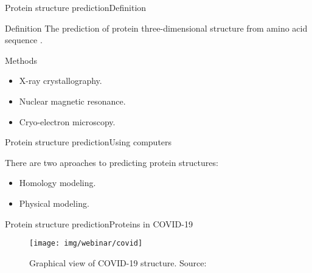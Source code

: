 \documentclass[10pt]{beamer}
\newcommand{\1}{
        	\setbeamertemplate{background}{
        		\texttt{[image: img/1]}
        		\tikz[overlay] \fill[fill opacity=0.75,fill=white] (0,0) rectangle (-\paperwidth,\paperheight);
        	}
}
\begin{document}
\begin{frame}{Protein structure prediction}{Definition}
	\begin{block}{Definition}
		The prediction of protein three-dimensional structure from amino acid sequence \cite{kuhlman2019advances}.
	\end{block}

	\pause
	\begin{block}{Methods}
		\begin{itemize}
			\item X-ray crystallography.
			\item Nuclear magnetic resonance.
			\item Cryo-electron microscopy.
		\end{itemize}
	\end{block}
\end{frame}

\begin{frame}{Protein structure prediction}{Using computers}
	\begin{block}{}
		There are two aproaches to predicting protein structures:
		\begin{itemize}
			\item Homology modeling.
			\item Physical modeling.
		\end{itemize}
	\end{block}
	
\end{frame}

\begin{frame}{Protein structure prediction}{Proteins in COVID-19}
	\begin{figure}[]
		\centering
		\texttt{[image: img/webinar/covid]}
		\label{img:mot2}
		\caption{Graphical view of COVID-19 structure. Source: \cite{Goodsell2020}}
	\end{figure}
\end{frame}
\end{document}
